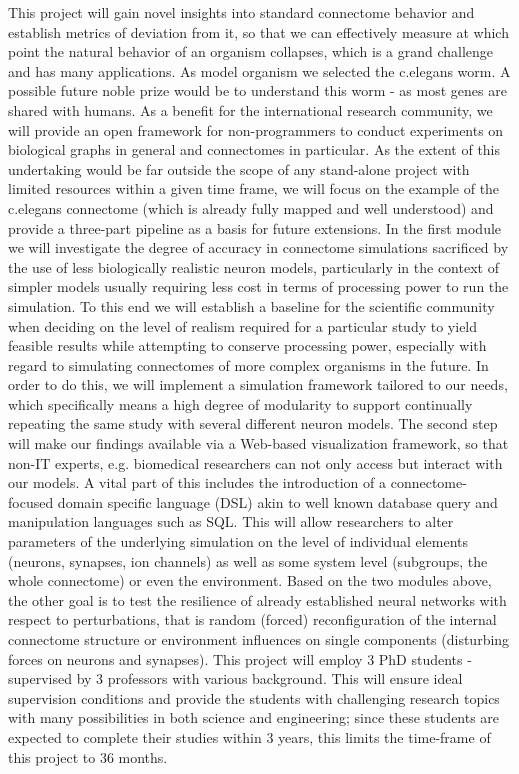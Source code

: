 \documentclass[a4paper,11pt]{article}
\begin{document}
This project will gain novel insights into standard connectome behavior and establish metrics of deviation from it, so that we can effectively measure at which point the natural behavior of an organism collapses, which is a grand challenge and has many applications. As model organism we selected the c.elegans worm. A possible future noble prize would be to understand this worm - as most genes are shared with humans.
As a benefit for the international research community, we will provide an open framework for non-programmers to conduct experiments on biological graphs in general and connectomes in particular. As the extent of this undertaking would be far outside the scope of any stand-alone project with limited resources within a given time frame, we will focus on the example of the c.elegans connectome (which is already fully mapped and well understood) and provide a three-part pipeline as a basis for future extensions. In the first module we will investigate the degree of accuracy in connectome simulations sacrificed by the use of less biologically realistic neuron models, particularly in the context of simpler models usually requiring less cost in terms of processing power to run the simulation. To this end we will establish a baseline for the scientific community when deciding on the level of realism required for a particular study to yield feasible results while attempting to conserve processing power, especially with regard to simulating connectomes of more complex organisms in the future. In order to do this, we will implement a simulation framework tailored to our needs, which specifically means a high degree of modularity to support continually repeating the same study with several different neuron models. The second step will make our findings available via a Web-based visualization framework, so that non-IT experts, e.g. biomedical researchers can not only access but interact with our models. A vital part of this includes the introduction of a connectome-focused domain specific language (DSL) akin to well known database query and manipulation languages such as SQL. This will allow researchers to alter parameters of the underlying simulation on the level of individual elements (neurons, synapses, ion channels) as well as some system level (subgroups, the whole connectome) or even the environment. Based on the two modules above, the other goal is to test the resilience of already established neural networks with respect to perturbations, that is random (forced) reconfiguration of the internal connectome structure or environment influences on single components (disturbing forces on neurons and synapses). This project will employ 3 PhD students - supervised by 3 professors with various background. This will ensure ideal supervision conditions and provide the students with challenging research topics with many possibilities in both science and engineering; since these students are expected to complete their studies within 3 years, this  limits the time-frame of this project to 36 months.
\end{document}
